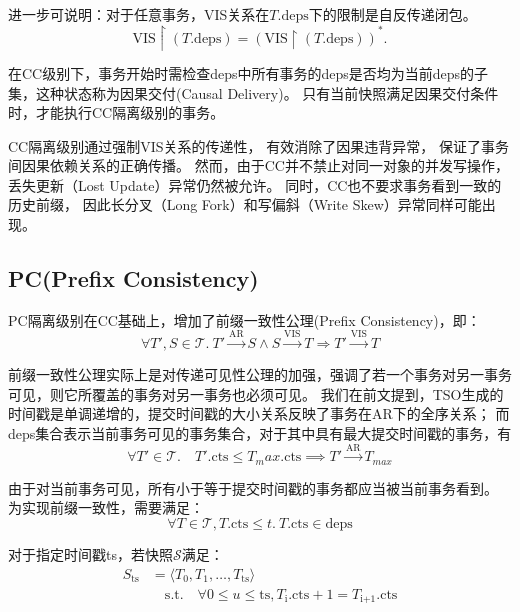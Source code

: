 进一步可说明：对于任意事务\Txc，VIS关系在$T.\text{deps}$下的限制是自反传递闭包。
\begin{equation}
    \text{VIS} \upharpoonright (T.\text{deps}) = \left( \text{VIS} \upharpoonright (T.\text{deps}) \right)^*.
\end{equation}

在CC级别下，事务开始时需检查deps中所有事务的deps是否均为当前deps的子集，这种状态称为因果交付(Causal Delivery)。
只有当前快照满足因果交付条件时，才能执行CC隔离级别的事务。

CC隔离级别通过强制VIS关系的传递性，
有效消除了因果违背异常，
保证了事务间因果依赖关系的正确传播。
然而，由于CC并不禁止对同一对象的并发写操作，
丢失更新（Lost Update）异常仍然被允许。
同时，CC也不要求事务看到一致的历史前缀，
因此长分叉（Long Fork）和写偏斜（Write Skew）异常同样可能出现。

\subsection{PC(Prefix Consistency)}

PC隔离级别在CC基础上，增加了前缀一致性公理(Prefix Consistency)，即：
\begin{equation}
 \forall T', S \in \mathcal{T}.\ T' \xrightarrow{\text{AR}} S \land S \xrightarrow{\text{VIS}} T \Rightarrow T' \xrightarrow{\text{VIS}} T
\end{equation}

前缀一致性公理实际上是对传递可见性公理的加强，强调了若一个事务对另一事务可见，则它所覆盖的事务对另一事务也必须可见。
我们在前文提到，TSO生成的时间戳是单调递增的，提交时间戳的大小关系反映了事务在AR下的全序关系；
而deps集合表示当前事务可见的事务集合，对于其中具有最大提交时间戳的事务\Txc[max]，有
\begin{equation}
    \forall T'\in \mathcal{T}.\quad T'.\text{cts} \le T_max.\text{cts} \implies T' \xrightarrow{\text{AR}} T_{max}
\end{equation}

由于\Txc[max]对当前事务可见，所有小于等于\Txc[max]提交时间戳的事务都应当被当前事务看到。
为实现前缀一致性，需要满足：
\begin{equation}
    \forall T \in \mathcal{T}, T.\text{cts} \leq t.\  T.\text{cts} \in \text{deps}
\end{equation}

对于指定时间戳ts，若快照$\mathcal{S}$满足：
\begin{equation}
\begin{aligned}
    S_\text{ts} &= \langle T_0,T_1,\dots,T_\text{ts}\rangle \\
      &\quad\text{s.t.}\quad \forall 0 \leq u \le \text{ts}, T_\text{i}.\text{cts} + 1 = T_\text{i+1}.\text{cts}
\end{aligned}
\end{equation}

